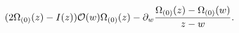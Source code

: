 \begin{equation}
(2 \Omega_{(0)}(z) -I(z)) {\cal O}(w) \Omega_{(0)}(z) - \partial_w
\frac{\Omega_{(0)}(z)-\Omega_{(0)}(w)}{z-w}.
\end{equation}

